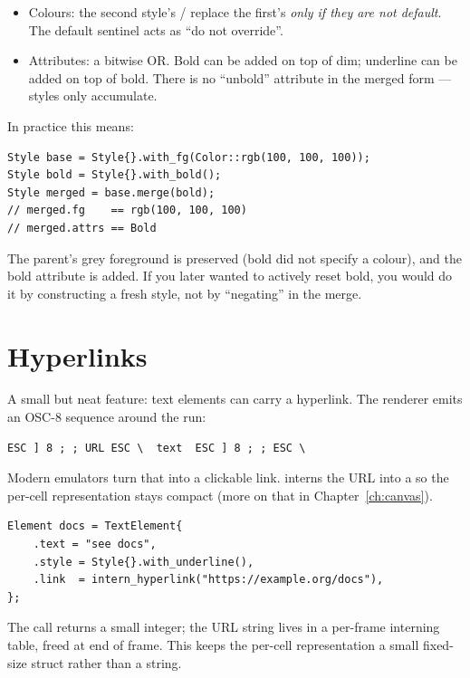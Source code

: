 \begin{itemize}[leftmargin=*]
  \item Colours: the second style's  /  replace
    the first's \emph{only if they are not default}. The default
    sentinel acts as ``do not override''.
  \item Attributes: a bitwise OR. Bold can be added on top of dim;
    underline can be added on top of bold. There is no ``unbold''
    attribute in the merged form --- styles only accumulate.
\end{itemize}

In practice this means:

\begin{lstlisting}
Style base = Style{}.with_fg(Color::rgb(100, 100, 100));
Style bold = Style{}.with_bold();
Style merged = base.merge(bold);
// merged.fg    == rgb(100, 100, 100)
// merged.attrs == Bold
\end{lstlisting}

The parent's grey foreground is preserved (bold did not specify a
colour), and the bold attribute is added. If you later wanted to
actively reset bold, you would do it by constructing a fresh style,
not by ``negating'' in the merge.

\section{Hyperlinks}

A small but neat feature: text elements can carry a hyperlink. The
renderer emits an OSC-8 sequence around the run:

\begin{lstlisting}
ESC ] 8 ; ; URL ESC \  text  ESC ] 8 ; ; ESC \
\end{lstlisting}

Modern emulators turn that into a clickable link. \maya{} interns the
URL into a \code{HyperlinkId} so the per-cell representation stays
compact (more on that in Chapter~\ref{ch:canvas}).

\begin{lstlisting}
Element docs = TextElement{
    .text = "see docs",
    .style = Style{}.with_underline(),
    .link  = intern_hyperlink("https://example.org/docs"),
};
\end{lstlisting}

The  call returns a small integer; the URL
string lives in a per-frame interning table, freed at end of frame.
This keeps the per-cell representation a small fixed-size struct
rather than a string.

